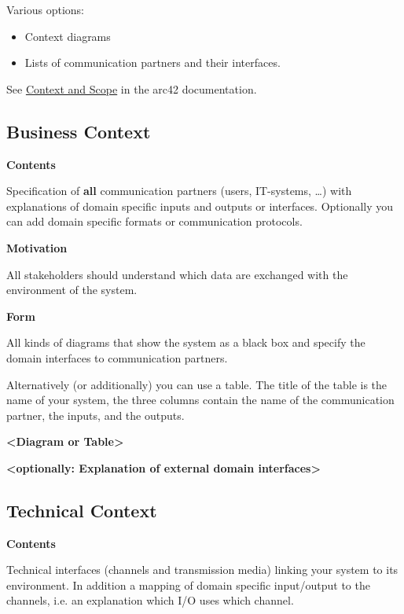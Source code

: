 \documentclass[
]{article}
\begin{document}
Various options:

\begin{itemize}
\item
  Context diagrams
\item
  Lists of communication partners and their interfaces.
\end{itemize}

See \href{https://docs.arc42.org/section-3/}{Context and Scope} in the
arc42 documentation.

\hypertarget{_business_context}{%
\subsection{Business Context}\label{_business_context}}

\textbf{Contents}

Specification of \textbf{all} communication partners (users, IT-systems,
\ldots) with explanations of domain specific inputs and outputs or
interfaces. Optionally you can add domain specific formats or
communication protocols.

\textbf{Motivation}

All stakeholders should understand which data are exchanged with the
environment of the system.

\textbf{Form}

All kinds of diagrams that show the system as a black box and specify
the domain interfaces to communication partners.

Alternatively (or additionally) you can use a table. The title of the
table is the name of your system, the three columns contain the name of
the communication partner, the inputs, and the outputs.

\textbf{\textless Diagram or Table\textgreater{}}

\textbf{\textless optionally: Explanation of external domain
interfaces\textgreater{}}

\hypertarget{_technical_context}{%
\subsection{Technical Context}\label{_technical_context}}

\textbf{Contents}

Technical interfaces (channels and transmission media) linking your
system to its environment. In addition a mapping of domain specific
input/output to the channels, i.e. an explanation which I/O uses which
channel.
\end{document}
